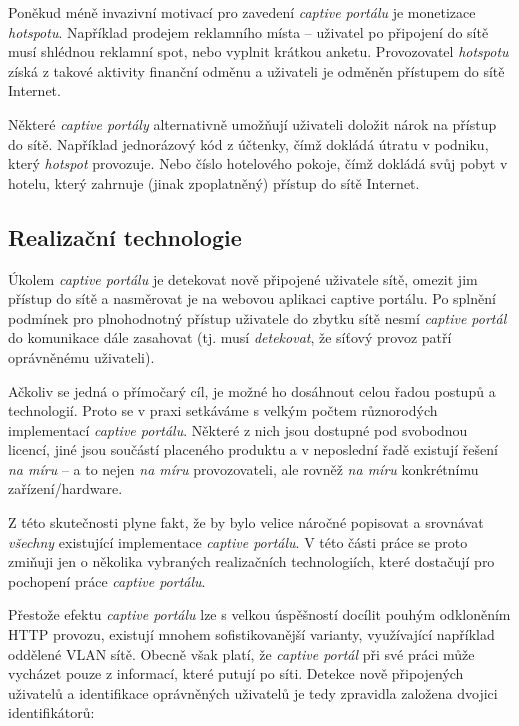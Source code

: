 \documentclass[thesis=M,czech]{FITthesis}[2012/10/20]
\begin{document}
Poněkud méně invazivní motivací pro zavedení \textit{captive portálu} je monetizace \textit{hotspotu}. Například prodejem reklamního místa -- uživatel po připojení do sítě musí shlédnou reklamní spot, nebo vyplnit krátkou anketu. Provozovatel \textit{hotspotu} získá z takové aktivity finanční odměnu a uživateli je odměněn přístupem do sítě Internet.

Některé \textit{captive portály} alternativně umožňují uživateli doložit nárok na přístup do sítě. Například jednorázový kód z účtenky, čímž dokládá útratu v podniku, který \textit{hotspot} provozuje. Nebo číslo hotelového pokoje, čímž dokládá svůj pobyt v hotelu, který zahrnuje (jinak zpoplatněný) přístup do sítě Internet.

\subsection{Realizační technologie}


Úkolem \textit{captive portálu} je detekovat nově připojené uživatele sítě, omezit jim přístup do sítě a nasměrovat je na webovou aplikaci captive portálu. Po splnění podmínek pro plnohodnotný přístup uživatele do zbytku sítě nesmí \textit{captive portál} do komunikace dále zasahovat (tj. musí \textit{detekovat}, že síťový provoz patří oprávněnému uživateli).

Ačkoliv se jedná o přímočarý cíl, je možné ho dosáhnout celou řadou postupů a technologií. Proto se v praxi setkáváme s velkým počtem různorodých implementací \textit{captive portálu}. Některé z nich jsou dostupné pod svobodnou licencí, jiné jsou součástí placeného produktu a v neposlední řadě existují řešení \textit{na míru} -- a to nejen \textit{na míru} provozovateli, ale rovněž \textit{na míru} konkrétnímu zařízení/hardware.

Z této skutečnosti plyne fakt, že by bylo velice náročné popisovat a srovnávat \textit{všechny} existující implementace \textit{captive portálu}. V této části práce se proto zmiňuji jen o několika vybraných realizačních technologiích, které dostačují pro pochopení práce \textit{captive portálu}.

Přestože efektu \textit{captive portálu} lze s velkou úspěšností docílit pouhým odkloněním HTTP provozu, existují mnohem sofistikovanější varianty, využívající například oddělené VLAN sítě. Obecně však platí, že \textit{captive portál} při své práci může vycházet pouze z informací, které putují po síti. Detekce nově připojených uživatelů a identifikace oprávněných uživatelů je tedy zpravidla založena dvojici identifikátorů:
\end{document}
